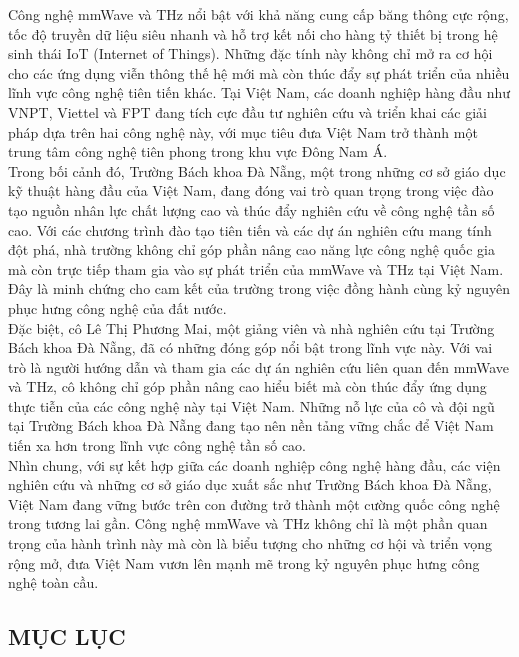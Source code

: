 \documentclass[a4paper,13pt]{article} %
\begin{document}
Công nghệ mmWave và THz nổi bật với khả năng cung cấp băng thông cực rộng, tốc độ truyền dữ liệu siêu nhanh và hỗ trợ kết nối cho hàng tỷ thiết bị trong hệ sinh thái IoT (Internet of Things). Những đặc tính này không chỉ mở ra cơ hội cho các ứng dụng viễn thông thế hệ mới mà còn thúc đẩy sự phát triển của nhiều lĩnh vực công nghệ tiên tiến khác. Tại Việt Nam, các doanh nghiệp hàng đầu như VNPT, Viettel và FPT đang tích cực đầu tư nghiên cứu và triển khai các giải pháp dựa trên hai công nghệ này, với mục tiêu đưa Việt Nam trở thành một trung tâm công nghệ tiên phong trong khu vực Đông Nam Á.\\

Trong bối cảnh đó, Trường Bách khoa Đà Nẵng, một trong những cơ sở giáo dục kỹ thuật hàng đầu của Việt Nam, đang đóng vai trò quan trọng trong việc đào tạo nguồn nhân lực chất lượng cao và thúc đẩy nghiên cứu về công nghệ tần số cao. Với các chương trình đào tạo tiên tiến và các dự án nghiên cứu mang tính đột phá, nhà trường không chỉ góp phần nâng cao năng lực công nghệ quốc gia mà còn trực tiếp tham gia vào sự phát triển của mmWave và THz tại Việt Nam. Đây là minh chứng cho cam kết của trường trong việc đồng hành cùng kỷ nguyên phục hưng công nghệ của đất nước.\\

Đặc biệt, cô Lê Thị Phương Mai, một giảng viên và nhà nghiên cứu tại Trường Bách khoa Đà Nẵng, đã có những đóng góp nổi bật trong lĩnh vực này. Với vai trò là người hướng dẫn và tham gia các dự án nghiên cứu liên quan đến mmWave và THz, cô không chỉ góp phần nâng cao hiểu biết mà còn thúc đẩy ứng dụng thực tiễn của các công nghệ này tại Việt Nam. Những nỗ lực của cô và đội ngũ tại Trường Bách khoa Đà Nẵng đang tạo nên nền tảng vững chắc để Việt Nam tiến xa hơn trong lĩnh vực công nghệ tần số cao.\\

Nhìn chung, với sự kết hợp giữa các doanh nghiệp công nghệ hàng đầu, các viện nghiên cứu và những cơ sở giáo dục xuất sắc như Trường Bách khoa Đà Nẵng, Việt Nam đang vững bước trên con đường trở thành một cường quốc công nghệ trong tương lai gần. Công nghệ mmWave và THz không chỉ là một phần quan trọng của hành trình này mà còn là biểu tượng cho những cơ hội và triển vọng rộng mở, đưa Việt Nam vươn lên mạnh mẽ trong kỷ nguyên phục hưng công nghệ toàn cầu.
\clearpage  

\begin{center}
\section{MỤC LỤC}
\end{center}
\end{document}
